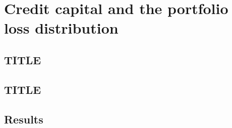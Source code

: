 \chapter{Credit capital and the portfolio loss distribution}
\label{ch:credit-capital}


\section{TITLE}
\label{sec:m16}


\section{TITLE}
\label{sec:m17}


\section{Results}
\label{sec:results-credit-capital}

